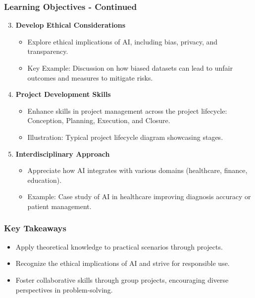 \documentclass[aspectratio=169]{beamer}
\begin{document}
\begin{frame}[fragile]
    \frametitle{Learning Objectives - Continued}
    \begin{enumerate}
        \setcounter{enumi}{2} %
        \item \textbf{Develop Ethical Considerations} 
        \begin{itemize}
            \item Explore ethical implications of AI, including bias, privacy, and transparency.
            \item Key Example: Discussion on how biased datasets can lead to unfair outcomes and measures to mitigate risks.
        \end{itemize}
        
        \item \textbf{Project Development Skills} 
        \begin{itemize}
            \item Enhance skills in project management across the project lifecycle: Conception, Planning, Execution, and Closure.
            \item Illustration: Typical project lifecycle diagram showcasing stages.
        \end{itemize}

        \item \textbf{Interdisciplinary Approach} 
        \begin{itemize}
            \item Appreciate how AI integrates with various domains (healthcare, finance, education).
            \item Example: Case study of AI in healthcare improving diagnosis accuracy or patient management.
        \end{itemize}
    \end{enumerate}
\end{frame}

\begin{frame}[fragile]
    \frametitle{Key Takeaways}
    \begin{itemize}
        \item Apply theoretical knowledge to practical scenarios through projects.
        \item Recognize the ethical implications of AI and strive for responsible use.
        \item Foster collaborative skills through group projects, encouraging diverse perspectives in problem-solving.
    \end{itemize}
\end{frame}
\end{document}
